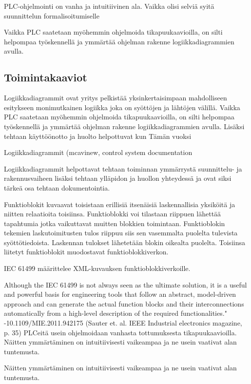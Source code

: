\documentclass[finnish,12pt]{article}
\begin{document}
PLC-ohjelmointi on vanha ja intuitiivinen ala. Vaikka olisi selviä syitä suunnittelun formalisoitumiselle

Vaikka PLC saatetaan myöhemmin ohjelmoida tikapuukaavioilla, on silti helpompaa työskennellä ja ymmärtää ohjelman rakenne logiikkadiagrammien avulla.

		\subsection{Toimintakaaviot}

Logiikkadiagrammit ovat yritys pelkistää yksinkertaisimpaan mahdolliseen esitykseen monimutkainen logiikka joka on syöttöjen ja lähtöjen välillä. Vaikka PLC saatetaan myöhemmin ohjelmoida tikapuukaavioilla, on silti helpompaa työskennellä ja ymmärtää ohjelman rakenne logiikkadiagrammien avulla. Lisäksi tehtaan käyttöönotto ja huolto helpottuvat kun
Tämän vuoksi 

Logiikkadiagrammit (mcavinew, control system documentation

Logiikkadiagrammit helpottavat tehtaan toiminnan ymmärrystä suunnittelu- ja rakennusvaiheen lisäksi tehtaan ylläpidon ja huollon yhteydessä ja ovat siksi tärkeä osa tehtaan dokumentointia.

Funktioblokit kuvaavat toisistaan erillisiä itsenäisiä laskennallisia yksiköitä ja niitten relaatioita toisiinsa. Funktioblokki voi tilastaan riippuen lähettää tapahtumia jotka vaikuttavat muitten blokkien toimintaan. Funktioblokin tekemien laskutoimitusten tulos riippuu siis sen vasemmalta puolelta tulevista syöttötiedoista. Laskennan tulokset lähetetään blokin oikealta puolelta. Toisiinsa liitetyt funktioblokit muodostavat funktioblokkiverkon. 

IEC 61499 määrittelee XML-kuvauksen funktioblokkiverkoille.

Although the IEC 61499 is not always seen as the ultimate solution, it is a useful and powerful basis for engineering tools that follow an abstract, model-driven approach and can generate the actual function blocks and their interconnections automatically from a high-level description of the required functionalities." -10.1109/MIE.2011.942175 (Sauter et. al. IEEE Industrial electronics magazine, p. 35)
PLCeitä usein ohjelmoidaan vanhasta tottumuksesta tikapuukaavioilla.
Näitten ymmärtäminen on intuitiivisesti vaikeampaa ja ne usein vaativat alan tuntemusta.


Näitten ymmärtäminen on intuitiivisesti vaikeampaa ja ne usein vaativat alan tuntemusta.
\end{document}
